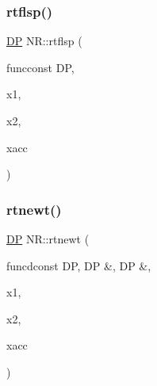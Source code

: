 \mbox{\label{namespaceNR_ab4085cd59aa4773f48fe033fb6be4418}} 
\subsubsection{\texorpdfstring{rtflsp()}{rtflsp()}}
{\footnotesize\ttfamily \mbox{\hyperlink{namespaceNR_af6ff762dd605ff477b8e52387253a02a}{DP}} N\+R\+::rtflsp (\begin{DoxyParamCaption}\item[{\mbox{\hyperlink{namespaceNR_af6ff762dd605ff477b8e52387253a02a}{DP}} }]{funcconst DP,  }\item[{const \mbox{\hyperlink{namespaceNR_af6ff762dd605ff477b8e52387253a02a}{DP}}}]{x1,  }\item[{const \mbox{\hyperlink{namespaceNR_af6ff762dd605ff477b8e52387253a02a}{DP}}}]{x2,  }\item[{const \mbox{\hyperlink{namespaceNR_af6ff762dd605ff477b8e52387253a02a}{DP}}}]{xacc }\end{DoxyParamCaption})}

\mbox{\label{namespaceNR_ae880eed2f01cf2dd35a36515f9ec1f8b}} 
\subsubsection{\texorpdfstring{rtnewt()}{rtnewt()}}
{\footnotesize\ttfamily \mbox{\hyperlink{namespaceNR_af6ff762dd605ff477b8e52387253a02a}{DP}} N\+R\+::rtnewt (\begin{DoxyParamCaption}\item[{void }]{funcdconst D\+P, D\+P \&, D\+P \&,  }\item[{const \mbox{\hyperlink{namespaceNR_af6ff762dd605ff477b8e52387253a02a}{DP}}}]{x1,  }\item[{const \mbox{\hyperlink{namespaceNR_af6ff762dd605ff477b8e52387253a02a}{DP}}}]{x2,  }\item[{const \mbox{\hyperlink{namespaceNR_af6ff762dd605ff477b8e52387253a02a}{DP}}}]{xacc }\end{DoxyParamCaption})}

\mbox{\label{namespaceNR_a37b63f41a0f8b8da8b68076cfa194a1f}} 
